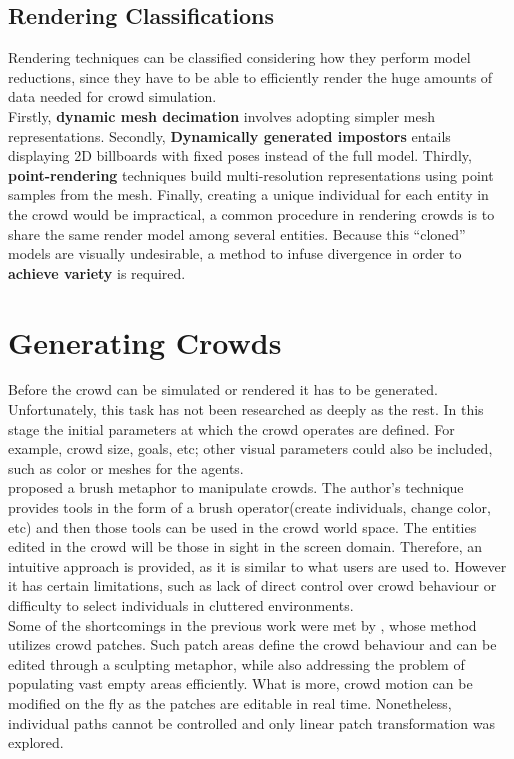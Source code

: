 \documentclass[6pt]{article} %
\begin{document}
\begin{multicols}{2}
\subsection{Rendering Classifications}
\label{subsec:RenderingClassification}

Rendering techniques can be classified considering how they perform model reductions, since they have to be able to efficiently render the huge amounts of data needed for crowd simulation.\\

Firstly, \textbf{dynamic mesh decimation} involves adopting simpler mesh representations.
Secondly, \textbf{Dynamically generated impostors} entails displaying 2D billboards with fixed poses instead of the full model.
Thirdly, \textbf{point-rendering} techniques build multi-resolution representations using point samples from the mesh.
Finally, creating a unique individual for each entity in the crowd would be impractical, a common procedure in rendering crowds is to share the same render model among several entities.
Because this ``cloned'' models are visually undesirable, a method to infuse divergence in order to \textbf{achieve variety} is required. 

\section{Generating Crowds}
\label{sec:CrowdGen}

Before the crowd can be simulated or rendered it has to be generated.
Unfortunately, this task has not been researched as deeply as the rest.
In this stage the initial parameters at which the crowd operates are defined.
For example, crowd size, goals, etc; other visual parameters could also be included, such as color or meshes  for the agents.\\

\cite{Ulicny2004} proposed a brush metaphor to manipulate crowds.
The author's technique provides tools in the form of a brush operator(create individuals, change color, etc) and then those tools can be used in the crowd world space.
The entities edited in the crowd will be those in sight in the screen domain.
Therefore, an intuitive approach is provided, as it is similar to what users are used to.
However it has certain limitations, such as lack of direct control over crowd behaviour or difficulty to select individuals in cluttered environments.\\

Some of the shortcomings in the previous work were met by \cite{Jordao2014}, whose method utilizes crowd patches.
Such patch areas define the crowd behaviour and can be edited through a sculpting metaphor, while also addressing the problem of populating vast empty areas efficiently.
What is more, crowd motion can be modified on the fly as the patches are editable in real time.
Nonetheless, individual paths cannot be controlled and only linear patch transformation was explored.


\end{multicols}
\end{document}
